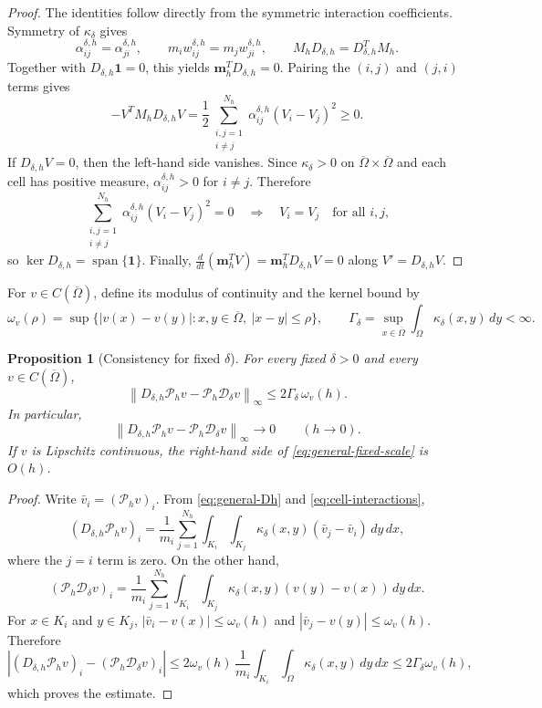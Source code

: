 \documentclass[11pt]{article}
\newtheorem{proposition}[theorem]{Proposition}
\theoremstyle{definition}
\newcommand{\cD}{\mathcal{D}}
\newcommand{\norm}[1]{\left\lVert #1\right\rVert}
\newcommand{\one}{\mathbf{1}}
\begin{document}
\begin{proof}
The identities follow directly from the symmetric interaction coefficients.
Symmetry of $\kappa_\delta$ gives
\[
 \alpha_{ij}^{\delta,h}=\alpha_{ji}^{\delta,h},\qquad
 m_iw_{ij}^{\delta,h}=m_jw_{ji}^{\delta,h},\qquad
 M_hD_{\delta,h}=D_{\delta,h}^TM_h.
\]
Together with $D_{\delta,h}\one=0$, this yields $\mathbf m_h^TD_{\delta,h}=0$.
Pairing the $(i,j)$ and $(j,i)$ terms gives
\[
 -V^TM_hD_{\delta,h}V
 =
 \frac12\sum_{\substack{i,j=1\\ i\ne j}}^{N_h}
 \alpha_{ij}^{\delta,h}(V_i-V_j)^2
 \ge0.
\]
If $D_{\delta,h}V=0$, then the left-hand side vanishes.  Since $\kappa_\delta>0$ on $\overline\Omega\times\overline\Omega$ and each cell has positive measure, $\alpha_{ij}^{\delta,h}>0$ for $i\ne j$.  Therefore
\[
 \sum_{\substack{i,j=1\\ i\ne j}}^{N_h}
 \alpha_{ij}^{\delta,h}(V_i-V_j)^2=0
 \quad\Longrightarrow\quad
 V_i=V_j\quad\text{for all }i,j,
\]
so $\ker D_{\delta,h}=\operatorname{span}\{\one\}$.  Finally,
$\frac{d}{dt}(\mathbf m_h^TV)=\mathbf m_h^TD_{\delta,h}V=0$ along $V'=D_{\delta,h}V$.
\end{proof}

For $v\in C(\overline\Omega)$, define its modulus of continuity and the kernel bound by
\[
 \omega_v(\rho)=\sup\{|v(x)-v(y)|:x,y\in\overline\Omega,\ |x-y|\le\rho\},
 \qquad
 \Gamma_\delta=\sup_{x\in\overline\Omega}\int_\Omega\kappa_\delta(x,y)\,dy<\infty.
\]

\begin{proposition}[Consistency for fixed $\delta$]
\label{prop:general-fixed-delta-consistency}
For every fixed $\delta>0$ and every $v\in C(\overline\Omega)$,
\begin{equation}
\label{eq:general-fixed-scale}
 \norm{D_{\delta,h}\mathcal P_hv
       -\mathcal P_h\cD_\delta v}_\infty
 \le 2\Gamma_\delta\,\omega_v(h).
\end{equation}
In particular,
\[
 \norm{D_{\delta,h}\mathcal P_hv
       -\mathcal P_h\cD_\delta v}_\infty
 \longrightarrow0
 \qquad(h\to0).
\]
If $v$ is Lipschitz continuous, the right-hand side of \eqref{eq:general-fixed-scale} is $O(h)$.
\end{proposition}

\begin{proof}
Write $\bar v_i=(\mathcal P_hv)_i$.  From \eqref{eq:general-Dh} and \eqref{eq:cell-interactions},
\[
 (D_{\delta,h}\mathcal P_hv)_i
 =
 \frac1{m_i}
 \sum_{j=1}^{N_h}
 \int_{K_i}\int_{K_j}
 \kappa_\delta(x,y)(\bar v_j-\bar v_i)\,dy\,dx,
\]
where the $j=i$ term is zero.  On the other hand,
\[
 (\mathcal P_h\cD_\delta v)_i
 =
 \frac1{m_i}
 \sum_{j=1}^{N_h}
 \int_{K_i}\int_{K_j}
 \kappa_\delta(x,y)(v(y)-v(x))\,dy\,dx.
\]
For $x\in K_i$ and $y\in K_j$, $|\bar v_i-v(x)|\le\omega_v(h)$ and $|\bar v_j-v(y)|\le\omega_v(h)$.  Therefore
\[
 \left|
 (D_{\delta,h}\mathcal P_hv)_i
 -(\mathcal P_h\cD_\delta v)_i
 \right|
 \le
 2\omega_v(h)\,
 \frac1{m_i}
 \int_{K_i}\int_\Omega\kappa_\delta(x,y)\,dy\,dx
 \le2\Gamma_\delta\omega_v(h),
\]
which proves the estimate.
\end{proof}
\end{document}
